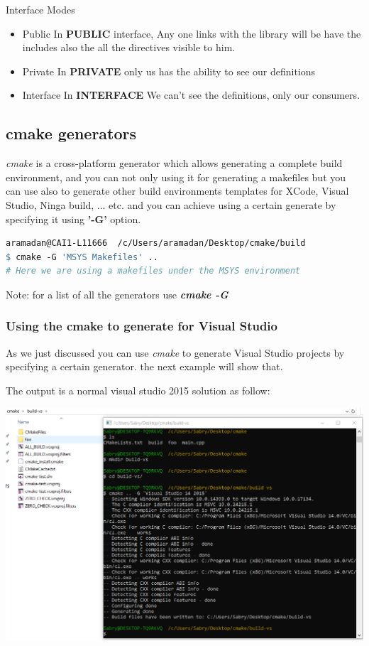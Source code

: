 \documentclass{article}
\begin{document}
Interface Modes
\begin{itemize}
    \item Public
    In \textbf{PUBLIC} interface, Any one links with the library will be have the includes also the all the directives visible to him. 
    \item Private 
    In \textbf{PRIVATE} only us has the ability to see our definitions
    \item Interface 
    In \textbf{INTERFACE} We can't see the definitions, only our consumers.
\end{itemize}

\subsection{cmake generators}
\textit{cmake} is a cross-platform generator which allows generating a complete build environment, and you can not only using it for generating a makefiles but you can use also to generate other build environments templates for XCode, Visual Studio, Ninga build, ... etc.
and you can achieve using a certain generate by specifying it using \textbf{'-G'} option.

\begin{lstlisting}[language=make, caption=Using a specific generator]
aramadan@CAI1-L11666  /c/Users/aramadan/Desktop/cmake/build
$ cmake -G 'MSYS Makefiles' ..
# Here we are using a makefiles under the MSYS environment
\end{lstlisting}

Note: for a list of all the generators use \textit{\textbf{cmake -G}} 

\subsubsection{Using the cmake to generate for Visual Studio}
As we just discussed you can use \textit{cmake} to generate Visual Studio projects by specifying a certain generator. the next example will show that.


The output is a normal visual studio 2015 solution as follow:

\begin{center}
\includegraphics[scale=0.50]{./resources/imgs/cmake/vs2015-generator.PNG}
\end{center}
\end{document}
